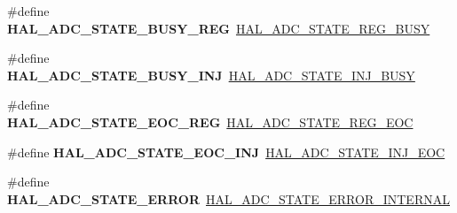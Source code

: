 \begin{DoxyCompactItemize}
\item 
\mbox{\label{group___h_a_l___a_d_c___aliased___defines_ga3bfd5015d60e3116e55ff81e6627f041}} 
\#define {\bfseries H\+A\+L\+\_\+\+A\+D\+C\+\_\+\+S\+T\+A\+T\+E\+\_\+\+B\+U\+S\+Y\+\_\+\+R\+EG}~\hyperlink{group___a_d_c___exported___types_ga516d4b4ebc261c241c69d96aae19acc3}{H\+A\+L\+\_\+\+A\+D\+C\+\_\+\+S\+T\+A\+T\+E\+\_\+\+R\+E\+G\+\_\+\+B\+U\+SY}
\item 
\mbox{\label{group___h_a_l___a_d_c___aliased___defines_ga9dc7360fd46380f3149e09780cd8f4b4}} 
\#define {\bfseries H\+A\+L\+\_\+\+A\+D\+C\+\_\+\+S\+T\+A\+T\+E\+\_\+\+B\+U\+S\+Y\+\_\+\+I\+NJ}~\hyperlink{group___a_d_c___exported___types_ga0044d240de80a70923b5c970d19ba24b}{H\+A\+L\+\_\+\+A\+D\+C\+\_\+\+S\+T\+A\+T\+E\+\_\+\+I\+N\+J\+\_\+\+B\+U\+SY}
\item 
\mbox{\label{group___h_a_l___a_d_c___aliased___defines_ga12555d013385a39ef776f1177420033c}} 
\#define {\bfseries H\+A\+L\+\_\+\+A\+D\+C\+\_\+\+S\+T\+A\+T\+E\+\_\+\+E\+O\+C\+\_\+\+R\+EG}~\hyperlink{group___a_d_c___exported___types_gae2da191bffb720a553a1e39c10929711}{H\+A\+L\+\_\+\+A\+D\+C\+\_\+\+S\+T\+A\+T\+E\+\_\+\+R\+E\+G\+\_\+\+E\+OC}
\item 
\mbox{\label{group___h_a_l___a_d_c___aliased___defines_ga2d1ddc7f0311b8faf6266a3e3c005c28}} 
\#define {\bfseries H\+A\+L\+\_\+\+A\+D\+C\+\_\+\+S\+T\+A\+T\+E\+\_\+\+E\+O\+C\+\_\+\+I\+NJ}~\hyperlink{group___a_d_c___exported___types_gafcfffd11ab8b84d3b0a1ce50ccf821d5}{H\+A\+L\+\_\+\+A\+D\+C\+\_\+\+S\+T\+A\+T\+E\+\_\+\+I\+N\+J\+\_\+\+E\+OC}
\item 
\mbox{\label{group___h_a_l___a_d_c___aliased___defines_ga83e3447e639d1a9019732255700ac23a}} 
\#define {\bfseries H\+A\+L\+\_\+\+A\+D\+C\+\_\+\+S\+T\+A\+T\+E\+\_\+\+E\+R\+R\+OR}~\hyperlink{group___a_d_c___exported___types_ga65b592627f1f9277f4b89bfc33a9e641}{H\+A\+L\+\_\+\+A\+D\+C\+\_\+\+S\+T\+A\+T\+E\+\_\+\+E\+R\+R\+O\+R\+\_\+\+I\+N\+T\+E\+R\+N\+AL}
\item 
\mbox{\label{group___h_a_l___a_d_c___aliased___defines_ga063cc0bfc15747a4c96d2868273a4516}} 

\end{DoxyCompactItemize}
